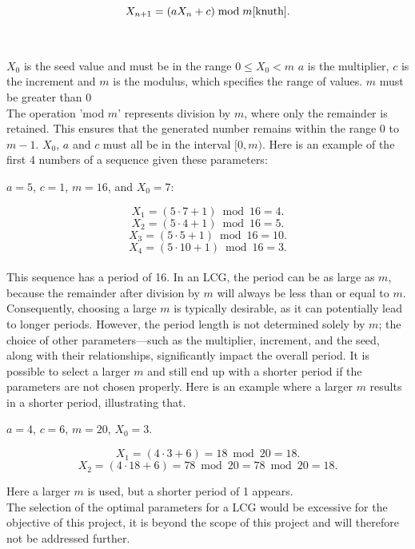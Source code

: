 $$X_{n+1} = (aX_n + c) \bmod m \cite{knuth}.$$  \\
\\
\noindent $X_0$ is the seed value and must be in the range $0 \leq X_0 < m$ \newline
$a$ is the multiplier,\newline 
$c$ is the increment and \newline
$m$ is the modulus, which specifies the range of values. $m$ must be greater than 0 \newline
\\
\noindent The operation 'mod $m$' represents division by $m$, where only the remainder
is retained. This ensures that the generated number remains within the range
0 to $m-1$.  $X_0$, $a$ and $c$ must all be in the interval $[0, m)$. 
Here is an example of the first 4 numbers of a sequence given these parameters: \newline

\begin{center}
	$a = 5$, $c = 1$, $m = 16$, and $X_0 = 7$:
\end{center}

$$X_1 = (5 \cdot 7 + 1)\bmod 16 = 4.$$
$$X_2 = (5 \cdot 4 + 1) \bmod 16 = 5.$$
$$X_3 = (5 \cdot 5 + 1) \bmod 16 = 10.$$
$$X_4 = (5 \cdot 10 + 1) \bmod 16 = 3.$$
\\
\noindent This sequence has a period of 16. In an LCG, the period can be as large as $m$,
because the remainder after division by $m$ will always be less than or equal to
$m$. Consequently, choosing a large $m$ is typically desirable, as it can potentially
lead to longer periods. However, the period length is not determined solely by
$m$; the choice of other parameters—such as the multiplier, increment, and the
seed, along with their relationships, significantly impact the overall period. It
is possible to select a larger $m$ and still end up with a shorter period if the parameters are not chosen properly. Here is an example where a larger $m$ results in a shorter period, illustrating that.

\begin{center}
	$a=4$, $c=6$, $m=20$, $X_0=3.$
\end{center}

$$X_1=(4 \cdot 3 +6)=18 \bmod 20=18.$$
$$X_2=(4 \cdot 18+6)=78 \bmod 20=78 \bmod 20=18.$$

\noindent Here a larger $m$ is used, but a shorter period of 1 appears. 
\newline \\
The selection of the optimal parameters for a LCG would be excessive for the objective of this project, it is beyond the scope of this project and will therefore not be addressed further.

